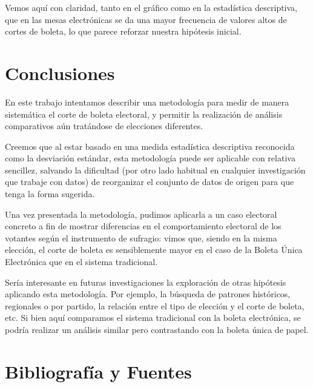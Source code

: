 \documentclass[12pt,a4paper]{article}
\begin{document}
Vemos aquí con claridad, tanto en el gráfico como en la estadística descriptiva,
que en las mesas electrónicas se da una mayor frecuencia de valores altos de
cortes de boleta, lo que parece reforzar nuestra hipótesis inicial.

\pagebreak

\section{Conclusiones}
En este trabajo intentamos describir una metodología para medir de manera
sistemática el corte de boleta electoral, y permitir la realización de análisis
comparativos aún tratándose de elecciones diferentes.

Creemos que al estar basado en una medida estadística descriptiva reconocida
como la desviación estándar, esta metodología puede ser aplicable con relativa
sencillez, salvando la dificultad (por otro lado habitual en cualquier
investigación que trabaje con datos) de reorganizar el conjunto de datos de
origen para que tenga la forma sugerida.

Una vez presentada la metodología, pudimos aplicarla a un caso electoral
concreto a fin de mostrar diferencias en el comportamiento electoral de los
votantes según el instrumento de sufragio: vimos que, siendo en la misma
elección, el corte de boleta es sensiblemente mayor en el caso de la Boleta
Única Electrónica que en el sistema tradicional.

Sería interesante en futuras investigaciones la exploración de otras hipótesis
aplicando esta metodología. Por ejemplo, la búsqueda de patrones históricos,
regionales o por partido, la relación entre el tipo de elección y el corte de
boleta, etc. Si bien aquí comparamos el sistema tradicional con la boleta
electrónica, se podría realizar un análisis similar pero contrastando con la
boleta única de papel.

\section{Bibliografía y Fuentes}
\end{document}
